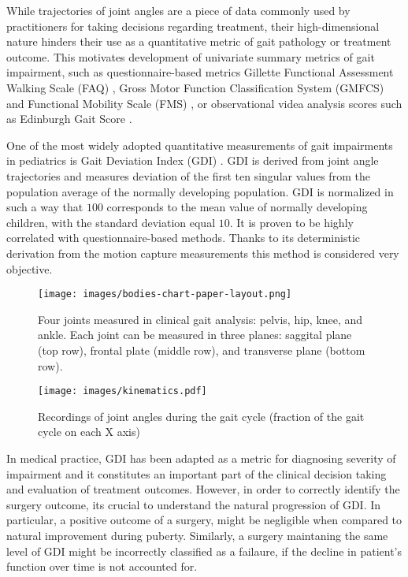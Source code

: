 \documentclass[preprint]{imsart}
\numberwithin{equation}{section}
\theoremstyle{plain}
\begin{document}
While trajectories of joint angles are a piece of data commonly used by practitioners for taking decisions regarding treatment, their high-dimensional nature hinders their use as a quantitative metric of gait pathology or treatment outcome. This motivates development of univariate summary metrics of gait impairment, such as questionnaire-based metrics Gillette Functional Assessment Walking Scale (FAQ) \citep{gorton2011gillette}, Gross Motor Function Classification System (GMFCS) \citep{palisano2008content} and Functional Mobility Scale (FMS) \citep{graham2004functional}, or observational videa analysis scores such as Edinburgh Gait Score \citep{read2003edinburgh}.

One of the most widely adopted quantitative measurements of gait impairments in pediatrics is Gait Deviation Index (GDI) \citep{schwartz2008gait}. GDI is derived from joint angle trajectories and measures deviation of the first ten singular values from the population average of the normally developing population. GDI is normalized in such a way that $100$ corresponds to the mean value of normally developing children, with the standard deviation equal $10$. It is proven to be highly correlated with questionnaire-based methods. Thanks to its deterministic derivation from the motion capture measurements this method is considered very objective.

\begin{figure}[p]
  \texttt{[image: images/bodies-chart-paper-layout.png]}
  \caption{Four joints measured in clinical gait analysis: pelvis, hip, knee, and ankle. Each joint can be measured in three planes: saggital plane (top row), frontal plate (middle row), and transverse plane (bottom row).}
    \label{fig:joint-angles}
  \texttt{[image: images/kinematics.pdf]}
  \caption{Recordings of joint angles during the gait cycle (fraction of the gait cycle on each X axis)}
    \label{fig:joint-angles-in-time}
\end{figure}


In medical practice, GDI has been adapted as a metric for diagnosing severity of impairment and it constitutes an important part of the clinical decision taking and evaluation of treatment outcomes. However, in order to correctly identify the surgery outcome, its crucial to understand the natural progression of GDI. In particular, a positive outcome of a surgery, might be negligible when compared to natural improvement during puberty. Similarly, a surgery maintaning the same level of GDI might be incorrectly classified as a failaure, if the decline in patient's function over time is not accounted for.
\end{document}
